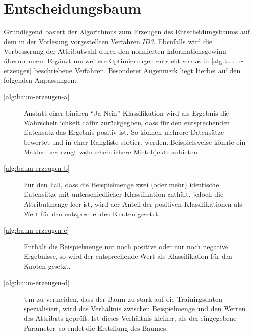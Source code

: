 \newpage
\section{Entscheidungsbaum}\label{sec:entscheidungsbaum}
Grundlegend basiert der Algorithmus zum Erzeugen des Entscheidungsbaums auf dem
in der Vorlesung vorgestellten Verfahren \emph{ID3}.
Ebenfalls wird die Verbesserung der Attributwahl durch den normierten Informationsgewinn übernommen.
Ergänzt um weitere Optimierungen entsteht so das in \autoref{alg:baum-erzeugen} beschriebene Verfahren.
Besonderer Augenmerk liegt hierbei auf den folgenden Anpassungen:
\begin{description}
    \item[\autoref{alg:baum-erzeugen-a}] Anstatt einer binären \enquote{Ja-Nein}-Klassifikation wird als Ergebnis die Wahrscheinlichkeit dafür zurückgegben,
                    dass für den entsprechenden Datensatz das Ergebnis positiv ist.
                    So können mehrere Datensätze bewertet und in einer Rangliste sortiert werden.
                    Beispielsweise könnte ein Makler bevorzugt wahrscheinlichere Mietobjekte anbieten.
    \item[\autoref{alg:baum-erzeugen-b}] Für den Fall, dass die Beispielmenge zwei (oder mehr) identische Datensätze mit unterschiedlicher Klassifikation enthält,
    jedoch die Attributmenge leer ist, wird der Anteil der positiven Klassifikationen als Wert für den entsprechenden Knoten gesetzt.
    \item[\autoref{alg:baum-erzeugen-c}] Enthält die Beispielmenge nur noch positive oder nur noch negative Ergebnisse,
        so wird der entsprechende Wert als Klassifikation für den Knoten gesetzt.
    \item[\autoref{alg:baum-erzeugen-d}] Um zu vermeiden, dass der Baum zu stark auf die Trainingsdaten spezialisiert,
        wird das Verhältnis zwischen Beispielmenge und den Werten des Attributs geprüft.
        Ist dieses Verhältnis kleiner, als der eingegebene Parameter, so endet die Erstellung des Baumes.

\end{description}

